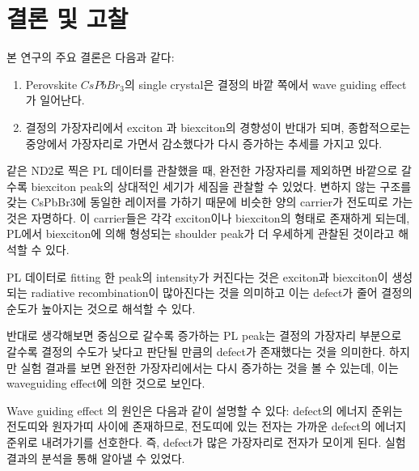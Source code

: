 \newpage

\section{결론 및 고찰}
본 연구의 주요 결론은 다음과 같다:
\begin{enumerate}
	\item Perovskite $CsPbBr_3$의 single crystal은 결정의 바깥 쪽에서 wave guiding effect가 일어난다.
	\item 결정의 가장자리에서 exciton 과 biexciton의 경향성이 반대가 되며, 종합적으로는 중앙에서 가장자리로 가면서 감소했다가 다시 증가하는 추세를 가지고 있다. 
\end{enumerate}
같은 ND2로 찍은 PL 데이터를 관찰했을 때, 완전한 가장자리를 제외하면 바깥으로 갈 수록 biexciton peak의 상대적인 세기가 세짐을 관찰할 수 있었다. 
변하지 않는 구조를 갖는 CsPbBr3에 동일한 레이저를 가하기 때문에 비슷한 양의 carrier가 전도띠로 가는 것은 자명하다. 이 carrier들은 각각 exciton이나 biexciton의 형태로 존재하게 되는데, PL에서 biexciton에 의해 형성되는 shoulder peak가 더 우세하게 관찰된 것이라고 해석할 수 있다. 

PL 데이터로 fitting 한 peak의 intensity가 커진다는 것은 exciton과 biexciton이 생성되는 radiative recombination이 많아진다는 것을 의미하고 이는 defect가 줄어 결정의 순도가 높아지는 것으로 해석할 수 있다.

반대로 생각해보면 중심으로 갈수록 증가하는 PL peak는 결정의 가장자리 부분으로 갈수록 결정의 수도가 낮다고 판단될 만큼의 defect가 존재했다는 것을 의미한다. 하지만 실험 결과를 보면 완전한 가장자리에서는 다시 증가하는 것을 볼 수 있는데, 이는 waveguiding effect에 의한 것으로 보인다. 

Wave guiding effect 의 원인은 다음과 같이 설명할 수 있다: defect의 에너지 준위는 전도띠와 원자가띠 사이에 존재하므로, 전도띠에 있는 전자는 가까운 defect의 에너지 준위로 내려가기를 선호한다. 즉, defect가 많은 가장자리로 전자가 모이게 된다. 실험 결과의 분석을 통해 알아낼 수 있었다. 